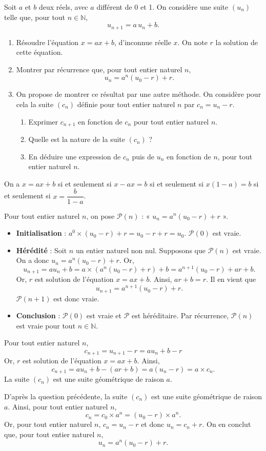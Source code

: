 \documentclass[11pt,fleqn]{book} %
\begin{document}
\begin{exercise}[subtitle={(Suites arithmético-géométriques)}]

 Soit \(a\) et \(b\) deux réels, avec \(a\) différent de 0 et 1. On considère une suite \((u_n)\) telle que, pour tout \(n\in\mathbb{N}\), 
\[u_{n+1}=a\,u_n+b.\]
\begin{enumerate}
\item Résoudre l'équation \(x =ax+b\), d'inconnue réelle \(x\). On note \(r\) la solution de cette équation.
\item Montrer par récurrence que, pour tout entier naturel \(n\),
\[u_n=a^n(u_0-r)+r.\]
\item On propose de montrer ce résultat par une autre méthode. On considère pour cela la suite \((c_n)\) définie pour tout entier naturel \(n\) par \(c_n=u_n-r\).
\begin{enumerate}
\item Exprimer \(c_{n+1}\) en fonction de \(c_n\) pour tout entier naturel \(n\). 
\item Quelle est la nature de la suite \((c_n)\) ?
\item En déduire une expression de \(c_n\) puis de \(u_n\) en fonction de \(n\), pour tout entier naturel \(n\).\end{enumerate}\end{enumerate}\end{exercise}
\begin{solution}On a \(x=ax+b\) si et seulement si \(x-ax=b\) si et seulement si \(x(1-a)=b\) si et seulement si \(x=\dfrac{b}{1-a}\).

Pour tout entier naturel \(n\), on pose \(\mathcal{P}(n)\) : « \(u_n=a^n(u_0-r)+r\) ».
\begin{itemize} \item \textbf{Initialisation} : \(a^0 \times (u_0-r)+r = u_0-r+r=u_0\). \( \mathcal{P}(0) \) est vraie.
\item \textbf{Hérédité} : Soit \(n\) un entier naturel non nul. Supposons que \( \mathcal{P}(n)\) est vraie. On a donc \(u_n=a^n(u_0-r)+r\). Or,
\[u_{n+1}= au_n+b=a \times (a^n(u_0-r)+r) + b = a^{n+1} (u_0-r)+ar+b.\]
Or, \(r\) est solution de l'équation \(x =ax+b\). Ainsi, \(ar+b=r\). Il en vient que
\[u_{n+1}=a^{n+1} (u_0-r)+r.\]
\( \mathcal{P}(n+1)\) est donc vraie.
\item \textbf{Conclusion} : \(\mathcal{P}(0)\) est vraie et \(\mathcal{P}\) est héréditaire. Par récurrence, \(\mathcal{P}(n)\) est vraie pour tout \(n\in\mathbb{N}\).\end{itemize}

Pour tout entier naturel \(n\),
\[c_{n+1}=u_{n+1}-r=au_n+b-r\]
Or, \(r\) est solution de l'équation \(x=ax+b\). Ainsi,
\[c_{n+1}=au_n+b-(ar+b) =a(u_n-r)=a\times c_n.\]
La suite \((c_n)\) est une suite géométrique de raison \(a\).

D'après la question précédente, la suite \((c_n)\) est une suite géométrique de raison \(a\). Ainsi, pour tout entier naturel \(n\),
\[c_n=c_0 \times a^n = (u_0-r) \times a^n.\]
Or, pour tout entier naturel \(n\), \(c_n=u_n-r\) et donc \(u_n=c_n+r\). On en conclut que, pour tout entier naturel \(n\),
\[u_n=a^n(u_0-r)+r.\]\end{solution}
\end{document}
